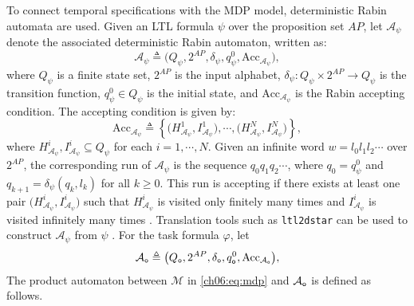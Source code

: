 To connect temporal specifications with the MDP model, deterministic Rabin
automata are used. Given an LTL formula \(\psi\) over the proposition set
\(AP\), let \(\mathcal{A}_{\psi}\) denote the associated deterministic Rabin
automaton, written as:
\begin{equation}
\label{ch06:eq:dra}
\mathcal{A}_{\psi} \triangleq
\bigl(
Q_{\psi}, 2^{AP}, \delta_{\psi}, q_{\psi}^{0},
\mathrm{Acc}_{\mathcal{A}_{\psi}}
\bigr),
\end{equation}
where \(Q_{\psi}\) is a finite state set, \(2^{AP}\) is the input alphabet,
\(\delta_{\psi} \colon Q_{\psi} \times 2^{AP} \rightarrow Q_{\psi}\) is the
transition function, \(q_{\psi}^{0} \in Q_{\psi}\) is the initial state, and
\(\mathrm{Acc}_{\mathcal{A}_{\psi}}\) is the Rabin accepting condition.
The accepting condition is given by:
\begin{equation}
\label{ch06:eq:dra-acc}
\mathrm{Acc}_{\mathcal{A}_{\psi}} \triangleq
\left\{
\bigl(H_{\mathcal{A}_{\psi}}^{1}, I_{\mathcal{A}_{\psi}}^{1}\bigr),
\cdots,
\bigl(H_{\mathcal{A}_{\psi}}^{N}, I_{\mathcal{A}_{\psi}}^{N}\bigr)
\right\},
\end{equation}
where
\(H_{\mathcal{A}_{\psi}}^{i}, I_{\mathcal{A}_{\psi}}^{i} \subseteq Q_{\psi}\)
for each \(i = 1,\cdots,N\). Given an infinite word
\(w = l_{0} l_{1} l_{2} \cdots\) over \(2^{AP}\), the corresponding run of
\(\mathcal{A}_{\psi}\) is the sequence
\(q_{0} q_{1} q_{2} \cdots\), where \(q_{0} = q_{\psi}^{0}\) and
\(q_{k+1} = \delta_{\psi}(q_{k}, l_{k})\) for all \(k \geq 0\). This run is
accepting if there exists at least one pair
\(\bigl(H_{\mathcal{A}_{\psi}}^{i}, I_{\mathcal{A}_{\psi}}^{i}\bigr)\) such
that \(H_{\mathcal{A}_{\psi}}^{i}\) is visited only finitely many times and
\(I_{\mathcal{A}_{\psi}}^{i}\) is visited infinitely many times
\citep{baier2008principles}. Translation tools such as \texttt{ltl2dstar} can
be used to construct \(\mathcal{A}_{\psi}\) from \(\psi\)
\citep{klein2007ltl2dstar}.
For the task formula \(\varphi\), let
\begin{equation}
\label{ch06:eq:dra-task}
\mathcal{A}_{\textup{\texttt{o}}} \triangleq
\bigl(
Q_{\textup{\texttt{o}}},
2^{AP},
\delta_{\textup{\texttt{o}}},
q_{\textup{\texttt{o}}}^{0},
\mathrm{Acc}_{\mathcal{A}_{\textup{\texttt{o}}}}
\bigr),
\end{equation}
 The product automaton between
\(\mathcal{M}\) in \eqref{ch06:eq:mdp} and
\(\mathcal{A}_{\textup{\texttt{o}}}\) is defined as follows.

